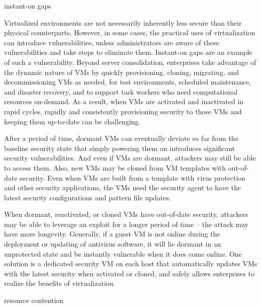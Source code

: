 instant-on gaps

Virtualized environments are not necessarily inherently less secure than their physical counterparts. However, in some cases, the practical uses of virtualization can introduce vulnerabilities, unless administrators are aware of these vulnerabilities and take steps to eliminate them. Instant-on gaps are an example of such a vulnerability.
Beyond server consolidation, enterprises take advantage of the dynamic nature of VMs by quickly provisioning, cloning, migrating, and decommissioning VMs as needed, for test environments, scheduled maintenance, and disaster recovery, and to support task workers who need computational resources on-demand. As a result, when VMs are activated and inactivated in rapid cycles, rapidly and consistently provisioning security to those VMs and keeping them up-to-date can be challenging.

After a period of time, dormant VMs can eventually deviate so far from the baseline security state that simply powering them on introduces significant security vulnerabilities. And even if VMs are dormant, attackers may still be able to access them. Also, new VMs may be cloned from VM templates with out-of-date security. Even when VMs are built from a template with virus protection and other security applications, the VMs need the security agent to have the latest security configurations and pattern file updates.

When dormant, reactivated, or cloned VMs have out-of-date security, attackers may be able to leverage an exploit for a longer period of time – the attack may have more longevity. Generally, if a guest VM is not online during the deployment or updating of antivirus software, it will lie dormant in an unprotected state and be instantly vulnerable when it does come online. One solution is a dedicated security VM on each host that automatically updates VMs with the latest security when activated or cloned, and safely allows enterprises to realize the benefits of virtualization.

resource contention 


